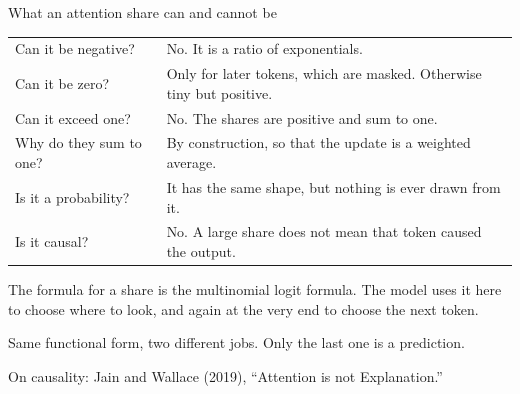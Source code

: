 \documentclass[aspectratio=169,11pt]{beamer}
\begin{document}
\begin{frame}{What an attention share can and cannot be}

\begin{center}
\footnotesize
\begin{tabular}{@{}ll@{}}
\toprule
Can it be negative? & No. It is a ratio of exponentials. \\
Can it be zero? & Only for later tokens, which are masked. Otherwise tiny but positive. \\
Can it exceed one? & No. The shares are positive and sum to one. \\
Why do they sum to one? & By construction, so that the update is a weighted average. \\
Is it a probability? & It has the same shape, but nothing is ever drawn from it. \\
Is it causal? & No. A large share does not mean that token caused the output. \\
\bottomrule
\end{tabular}
\end{center}

\vspace{0.3cm}

The formula for a share is the multinomial logit formula. The model uses it here to choose where to look, and again at the very end to choose the next token.

\vspace{0.25cm}

\alert{Same functional form, two different jobs. Only the last one is a prediction.}

\vspace{0.05cm}
{\scriptsize\color{warmgray}On causality: Jain and Wallace (2019), ``Attention is not Explanation.''}

\end{frame}
\end{document}

